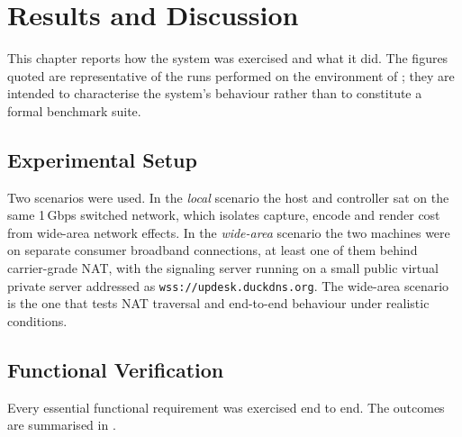 \chapter{Results and Discussion}

This chapter reports how the system was exercised and what it did. The figures
quoted are representative of the runs performed on the environment of
; they are intended to characterise the system's behaviour rather
than to constitute a formal benchmark suite.

\section{Experimental Setup}

Two scenarios were used. In the \emph{local} scenario the host and controller sat
on the same 1\,Gbps switched network, which isolates capture, encode and render
cost from wide-area network effects. In the \emph{wide-area} scenario the two
machines were on separate consumer broadband connections, at least one of them
behind carrier-grade NAT, with the signaling server running on a small public
virtual private server addressed as \texttt{wss://updesk.duckdns.org}. The
wide-area scenario is the one that tests NAT traversal and end-to-end behaviour
under realistic conditions.

\section{Functional Verification}

Every essential functional requirement was exercised end to end. The outcomes are
summarised in .

